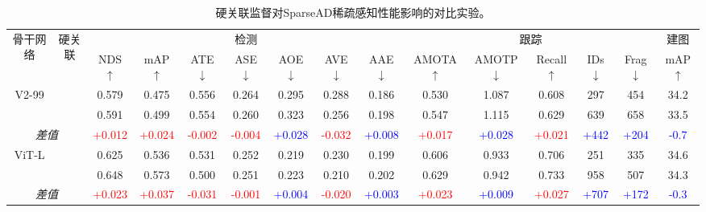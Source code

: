 \begin{table}[t]
		\caption{硬关联监督对SparseAD稀疏感知性能影响的对比实验。}
		\begin{center}
			\tiny
			\vspace{-10pt}
			\resizebox{1\textwidth}{!}
			{
				\begin{tabular}{c|c|cc|ccccc|ccccc|c}
					\toprule
					\multirow{2}{*}{骨干网络}& \multirow{2}{*}{硬关联}& \multicolumn{7}{c|}{检测} & \multicolumn{5}{c}{跟踪}& 建图\\
					&&NDS$\uparrow$&	mAP$\uparrow$&	ATE$\downarrow$&	ASE$\downarrow$&	AOE$\downarrow$	&AVE$\downarrow$&	AAE$\downarrow$& AMOTA$\uparrow$&	AMOTP$\downarrow$&	Recall$\uparrow$ & IDs$\downarrow$ &Frag$\downarrow$& mAP$\uparrow$\\
					\midrule
					\multirow{2}{*}{V2-99\cite{lee2020centermask}}& \Checkmark& 0.579&	0.475&	0.556&	0.264&	0.295&	0.288&	0.186&0.530&	1.087&	0.608 &297&	454& 34.2\\
					&\XSolidBrush &0.591&	0.499&	0.554&	0.260&	0.323&	0.256&	0.198& 0.547&	1.115&	0.629 &639&	658	& 33.5\\
					\midrule
					\multicolumn{2}{|c|}{\textit{差值}}& \textcolor{red}{+0.012}& \textcolor{red}{+0.024} &\textcolor{red}{-0.002} &\textcolor{red}{-0.004}& \textcolor{blue}{+0.028} &\textcolor{red}{-0.032}& \textcolor{blue}{+0.008}& \textcolor{red}{+0.017} &\textcolor{blue}{+0.028}& \textcolor{red}{+0.021}& \textcolor{blue}{+442}& \textcolor{blue}{+204}&\textcolor{blue}{-0.7}\\
					\midrule
					\multirow{2}{*}{ViT-L\cite{dosovitskiy2020image}}& \Checkmark& 0.625&	0.536&	0.531&	0.252&	0.219&	0.230&	0.199& 0.606&	0.933&	0.706&251&	335	& 34.6\\
					&\XSolidBrush&0.648&	0.573&	0.500&	0.251&	0.223&	0.210&	0.202&0.629&	0.942&	0.733 &958&	507 & 34.3\\
					\midrule
					\multicolumn{2}{|c|}{\textit{差值}} & \textcolor{red}{+0.023}& \textcolor{red}{+0.037}& \textcolor{red}{-0.031}& \textcolor{red}{-0.001}& \textcolor{blue}{+0.004}& \textcolor{red}{-0.020}& \textcolor{blue}{+0.003}& \textcolor{red}{+0.023}& \textcolor{blue}{+0.009}& \textcolor{red}{+0.027}& \textcolor{blue}{+707}& \textcolor{blue}{+172} & \textcolor{blue}{-0.3}\\
					\bottomrule
				\end{tabular}%
			}
		\end{center}
		\label{tab:hard-asso-det-tracking}
	\end{table}

